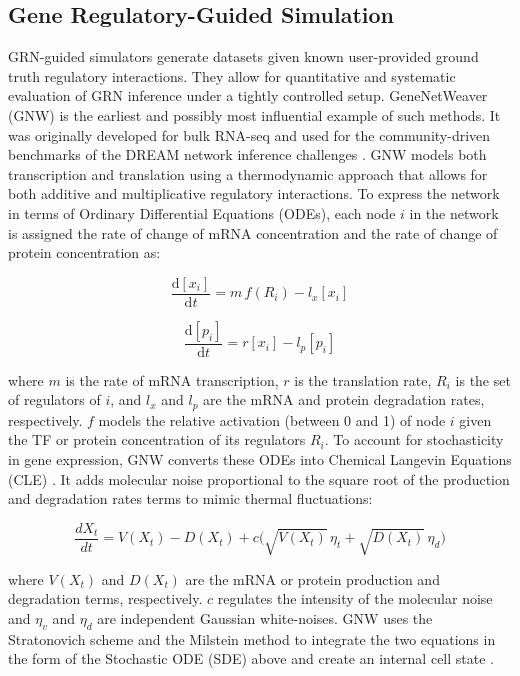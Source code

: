 


\subsection*{Gene Regulatory-Guided Simulation}
  GRN-guided simulators generate datasets given known user-provided ground truth regulatory interactions. They allow for quantitative and systematic evaluation of GRN inference under a tightly controlled setup. GeneNetWeaver (GNW) \cite{schaffter2011genenetweaver} is the earliest and possibly most influential example of such methods. It was originally developed for bulk RNA-seq and used for the community-driven benchmarks of the DREAM network inference challenges \cite{marbach2012wisdom}. GNW models both transcription and translation using a thermodynamic approach that allows for both additive and multiplicative regulatory interactions. To express the network in terms of Ordinary Differential Equations (ODEs), each node $i$ in the network is assigned the rate of change of mRNA concentration and the rate of change of protein concentration as:  

\[\frac{{{\mathrm{d}}\left[ {x_{{i}}} \right]}}{{{\mathrm{d}t}}} = m\,f\left( {R_{{i}}} \right) - l_{{x}}\left[ {x_{{i}}} \right]\]

\[\frac{{{\mathrm{d}}\left[ {p_{{i}}} \right]}}{{{\mathrm{d}t}}} = r\left[ {x_{{i}}} \right] - l_{{p}}\left[ {p_{{i}}} \right]\]

where $m$ is the rate of mRNA transcription, $r$ is the translation rate, $R_i$ is the set of regulators of $i$, and $l_x$ and $l_p$ are the mRNA and protein degradation rates, respectively. $f$ models the relative activation (between 0 and 1) of node $i$ given the TF or protein concentration of its regulators $R_i$. To account for stochasticity in gene expression, GNW converts these ODEs into Chemical Langevin Equations (CLE) \cite{gillespie2000chemical}. It adds molecular noise proportional to the square root of the production and degradation rates terms to mimic thermal fluctuations:

\[
\frac{dX_t}{dt} = V(X_t) - D(X_t) + c\Big(\sqrt{V(X_t)}\,\eta_t + \sqrt{D(X_t)}\,\eta_d\Big)
\]

where $V(X_t)$ and $D(X_t)$ are the mRNA or protein production and degradation terms, respectively. $c$ regulates the intensity of the molecular noise and $\eta_v$ and $\eta_d$ are independent Gaussian white-noises. GNW uses the Stratonovich scheme and the Milstein method to integrate the two equations in the form of the Stochastic ODE (SDE) above and create an internal cell state \cite{schaffter2010numerical}.

